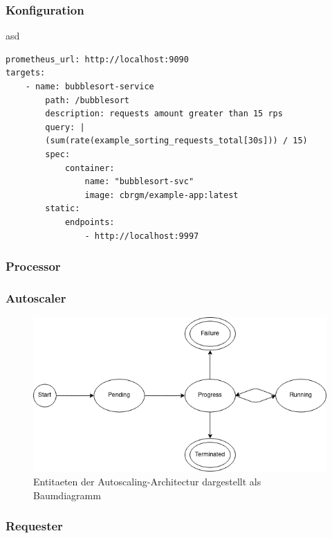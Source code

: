 \documentclass[runningheads]{llncs}
\begin{document}
\subsubsection{Konfiguration} \label{configuration}

asd

\begin{lstlisting}[caption={Ein Beispiel fuer eine \textbf{cloudburst.yaml} Datei. Definiert wird ein Service mit einer Abfrage formuliert in PromQL, einer Angabe der Parameter fuer zu startende Container-Instanzen (\textit{spec}) und eine Liste von lokal erreichbaren Endpunkten (\textit{static})},captionpos=b]
prometheus_url: http://localhost:9090
targets:
	- name: bubblesort-service
		path: /bubblesort
		description: requests amount greater than 15 rps
		query: |
		(sum(rate(example_sorting_requests_total[30s])) / 15)
		spec:
			container:
				name: "bubblesort-svc"
				image: cbrgm/example-app:latest
		static:
			endpoints:
				- http://localhost:9997
\end{lstlisting}
	
\subsubsection{Processor}
	
\subsubsection{Autoscaler}

\begin{figure}[h]
	\centering
	\includegraphics[width=0.8\linewidth,scale=0.8]{images/state.png}
	\caption{Entitaeten der Autoscaling-Architectur dargestellt als Baumdiagramm}
\end{figure}
	
\subsubsection{Requester}
	
\end{document}
